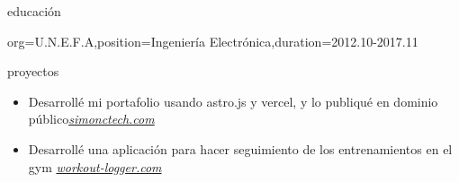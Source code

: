 \documentclass{resume}
\begin{document}
\begin{ResumeSection}{educación}
    \begin{ResumeSubsection}{org={U.N.E.F.A},position={Ingeniería Electrónica},duration={2012.10-2017.11}}
    \end{ResumeSubsection}
\end{ResumeSection}

\begin{ResumeSection}{proyectos}
    \begin{itemize}
        \item Desarrollé mi portafolio usando astro.js y vercel, y lo publiqué en dominio público\hfill\em{{\href{https://www.simonctech.com}{simonctech.com}}}
    \end{itemize}
    \begin{itemize}
        \item Desarrollé una aplicación para hacer seguimiento de los entrenamientos en el gym \hfill\em{{\href{https://workout-logger-sable.vercel.app/}{workout-logger.com}}}
    \end{itemize}
\end{ResumeSection}
\end{document}
